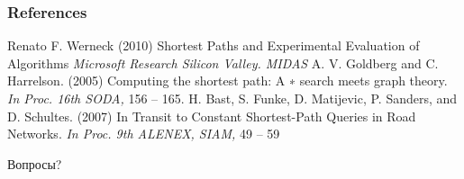 \documentclass{beamer}
\begin{document}
\begin{frame}
\frametitle{References}
\footnotesize{
\begin{thebibliography}{99} %
 Renato F. Werneck (2010)
\newblock Shortest Paths and Experimental Evaluation of Algorithms
\newblock \emph{Microsoft Research Silicon Valley. MIDAS}
 A. V. Goldberg and C. Harrelson. (2005)
\newblock Computing the shortest path: A ∗ search meets graph theory.
\newblock \emph{In Proc. 16th SODA,} 156 -- 165.
 H. Bast, S. Funke, D. Matijevic, P. Sanders, and D. Schultes. (2007)
\newblock In Transit to Constant Shortest-Path Queries in Road Networks. 
\newblock \emph{In Proc. 9th ALENEX, SIAM,} 49 -- 59
\end{thebibliography}
}
\end{frame}



\begin{frame}
\Huge{\centerline{Вопросы?}}
\end{frame}

\end{document}
